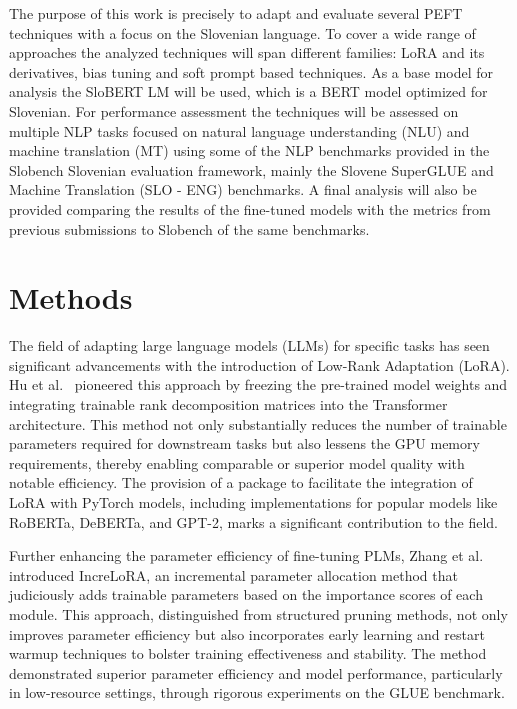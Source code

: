 \documentclass[fleqn,moreauthors,10pt]{ds_report}
\begin{document}
    The purpose of this work is precisely to adapt and evaluate several PEFT techniques with a focus on the Slovenian language. To cover a wide range of approaches the analyzed techniques will span different families: LoRA\cite{hu2022lora} and its derivatives, bias tuning\cite{bitfit} and soft prompt based techniques. As a base model for analysis the SloBERT LM will be used, which is a BERT model optimized for Slovenian. For performance assessment the techniques will be assessed on multiple NLP tasks focused on natural language understanding (NLU) and machine translation (MT) using some of the NLP benchmarks provided in the Slobench Slovenian evaluation framework, mainly the Slovene SuperGLUE and Machine Translation (SLO - ENG) benchmarks. A final analysis will also be provided comparing the results of the fine-tuned models with the metrics from previous submissions to Slobench of the same benchmarks. 



\section*{Methods}

The field of adapting large language models (LLMs) for specific tasks has seen significant advancements with the introduction of Low-Rank Adaptation (LoRA). Hu et al.~\cite{hu2022lora} pioneered this approach by freezing the pre-trained model weights and integrating trainable rank decomposition matrices into the Transformer architecture. This method not only substantially reduces the number of trainable parameters required for downstream tasks but also lessens the GPU memory requirements, thereby enabling comparable or superior model quality with notable efficiency. The provision of a package to facilitate the integration of LoRA with PyTorch models, including implementations for popular models like RoBERTa, DeBERTa, and GPT-2, marks a significant contribution to the field.

Further enhancing the parameter efficiency of fine-tuning PLMs, Zhang et al.~\cite{zhang2023increlora} introduced IncreLoRA, an incremental parameter allocation method that judiciously adds trainable parameters based on the importance scores of each module. This approach, distinguished from structured pruning methods, not only improves parameter efficiency but also incorporates early learning and restart warmup techniques to bolster training effectiveness and stability. The method demonstrated superior parameter efficiency and model performance, particularly in low-resource settings, through rigorous experiments on the GLUE benchmark.
\end{document}
